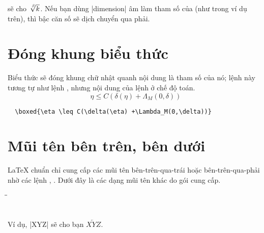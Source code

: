 \medskip\noindent
sẽ cho $\sqrt[\leftroot{-2}\uproot{2}\beta]{k}$. Nếu bạn dùng |dimension|
âm làm tham số của  (như trong ví dụ trên),
thì bậc căn số sẽ dịch chuyển qua phải.

\section{Đóng khung biểu thức}

Biểu thức  sẽ đóng khung chữ nhật quanh nội dung là tham số của nó;
lệnh này tương tự như lệnh , nhưng nội dung của lệnh ở chế độ toán.
\begin{equation}
\boxed{\eta \leq C(\delta(\eta) +\Lambda_M(0,\delta))}
\end{equation}
\begin{verbatim}
  \boxed{\eta \leq C(\delta(\eta) +\Lambda_M(0,\delta))}
\end{verbatim}

\section{Mũi tên bên trên, bên dưới}

\LaTeX{} chuẩn chỉ cung cấp các mũi tên bên-trên-qua-trái hoặc bên-trên-qua-phải
nhờ các lệnh , . Dưới đây là các dạng
mũi tên khác do gói  cung cấp.

\begin{tabbing}
\qquad\=\qquad\=\kill
\>     \>  \+\\
       \>  \\
   \> 
\end{tabbing}

Ví dụ, |{XYZ}| sẽ cho bạn $\overleftarrow{XYZ}$.

